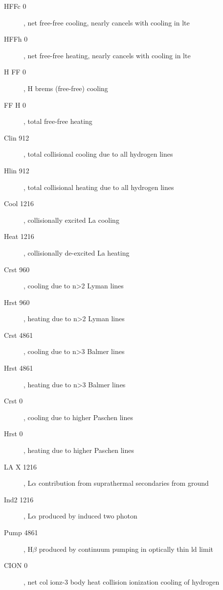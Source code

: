 \begin{description}
\item[HFFc    0], net free-free cooling, nearly cancels with cooling in lte

\item[HFFh   0], net free-free heating, nearly cancels with cooling in lte

\item[H FF   0], H brems (free-free) cooling

\item[FF H    0], total free-free heating

\item[Clin  912], total collisional cooling due to all hydrogen lines

\item[Hlin  912], total collisional heating due to all hydrogen lines

\item[Cool 1216], collisionally excited La cooling

\item[Heat 1216], collisionally de-excited La heating

\item[Crst  960], cooling due to n>2 Lyman lines

\item[Hrst  960], heating due to n>2 Lyman lines

\item[Crst 4861], cooling due to n>3 Balmer lines

\item[Hrst 4861], heating due to n>3 Balmer lines

\item[Crst    0], cooling due to higher Paschen lines

\item[Hrst    0], heating due to higher Paschen lines

\item[LA X 1216], L$\alpha $ contribution from suprathermal secondaries from ground

\item[Ind2 1216], L$\alpha $ produced by induced two photon

\item[Pump 4861], H$\beta$ produced by continuum pumping in optically thin ld limit

\item[CION    0], net col ionz-3 body heat collision ionization cooling of
hydrogen


\end{description}
